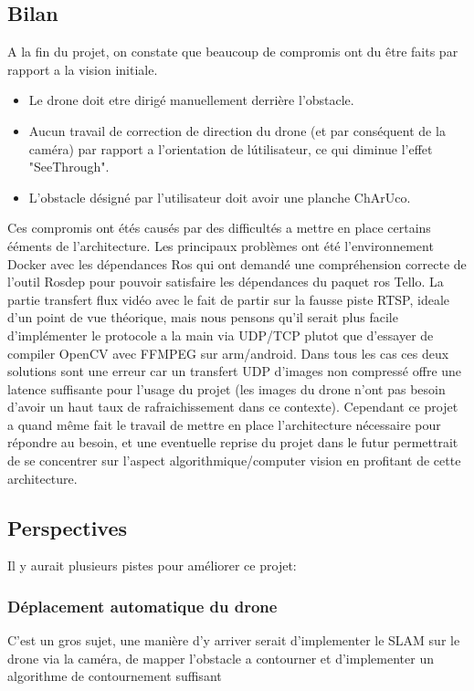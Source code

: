 \documentclass{article}
\begin{document}
\subsection*{Bilan}
A la fin du projet, on constate que beaucoup de compromis ont du \^etre faits par rapport a la vision initiale.
\begin{itemize}
    \item Le drone doit etre dirig\'e manuellement derri\`ere l'obstacle.
    \item Aucun travail de correction de direction du drone (et par cons\'equent de la cam\'era) par rapport a l'orientation de l\'utilisateur, ce qui diminue l'effet "SeeThrough".
    \item L'obstacle d\'esign\'e par l'utilisateur doit avoir une planche ChArUco.
\end{itemize}
Ces compromis ont \'et\'es caus\'es par des difficult\'es a mettre en place
certains \'e\'ements de l'architecture. Les principaux probl\`emes ont \'et\'e
l'environnement Docker avec les d\'ependances Ros qui ont demand\'e une
compr\'ehension correcte de l'outil Rosdep pour pouvoir satisfaire les
d\'ependances du paquet ros Tello. La partie transfert flux vid\'eo avec le fait
de partir sur la fausse piste RTSP, ideale d'un point de vue th\'eorique, mais
nous pensons qu'il serait plus facile d'impl\'ementer le protocole a la main via
UDP/TCP plutot que d'essayer de compiler OpenCV avec FFMPEG sur arm/android.
Dans tous les cas ces deux solutions sont une erreur car un transfert UDP
d'images non compress\'e offre une latence suffisante pour l'usage du projet
(les images du drone n'ont pas besoin d'avoir un haut taux de rafraichissement
dans ce contexte). Cependant ce projet a quand m\^eme fait le travail de mettre en
place l'architecture n\'ecessaire pour r\'epondre au besoin, et une eventuelle
reprise du projet dans le futur permettrait de se concentrer sur l'aspect
algorithmique/computer vision en profitant de cette architecture.

\subsection*{Perspectives}
Il y aurait plusieurs pistes pour am\'eliorer ce projet:
\subsubsection*{D\'eplacement automatique du drone}
C'est un gros sujet, une mani\`ere d'y arriver serait d'implementer le SLAM sur le drone via la cam\'era, de mapper l'obstacle a contourner et d'implementer un algorithme de contournement suffisant
\end{document}
